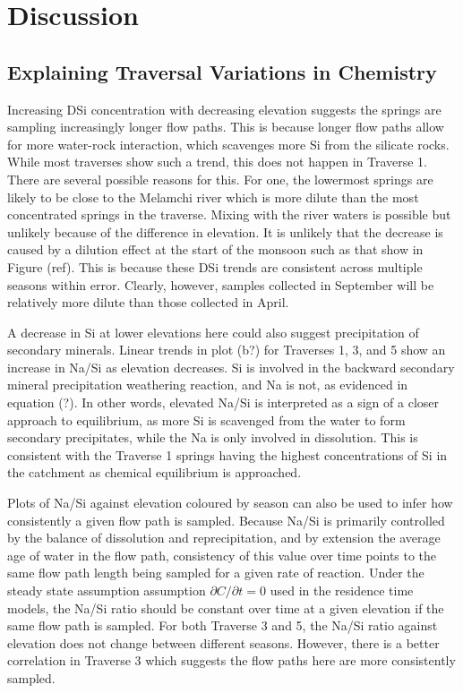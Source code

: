 

\section{Discussion}

\subsection{Explaining Traversal Variations in Chemistry}

Increasing DSi concentration with decreasing elevation suggests the springs are sampling increasingly longer flow paths. This is because longer flow paths allow for more water-rock interaction, which scavenges more Si from the silicate rocks. While most traverses show such a trend, this does not happen in Traverse 1. There are several possible reasons for this. For one, the lowermost springs are likely to be close to the Melamchi river which is more dilute than the most concentrated springs in the traverse. Mixing with the river waters is possible but unlikely because of the difference in elevation. It is unlikely that the decrease is caused by a dilution effect at the start of the monsoon such as that show in Figure (ref). This is because these DSi trends are consistent across multiple seasons within error. Clearly, however, samples collected in September will be relatively more dilute than those collected in April.

\bsk

A decrease in Si at lower elevations here could also suggest precipitation of secondary minerals. Linear trends in plot (b?) for Traverses 1, 3, and 5 show an increase in Na/Si as elevation decreases. Si is involved in the backward secondary mineral precipitation weathering reaction, and Na is not, as evidenced in equation (?). In other words, elevated Na/Si is interpreted as a sign of a closer approach to equilibrium, as more Si is scavenged from the water to form secondary precipitates, while the Na is only involved in dissolution. This is consistent with the Traverse 1 springs having the highest concentrations of Si in the catchment as chemical equilibrium is approached. 

\bsk

Plots of Na/Si against elevation coloured by season can also be used to infer how consistently a given flow path is sampled. Because Na/Si is primarily controlled by the balance of dissolution and reprecipitation, and by extension the average age of water in the flow path, consistency of this value over time points to the same flow path length being sampled for a given rate of reaction. Under the steady state assumption assumption $\partial C/\partial t = 0$ used in the residence time models, the Na/Si ratio should be constant over time at a given elevation if the same flow path is sampled. For both Traverse 3 and 5, the Na/Si ratio against elevation does not change between different seasons. However, there is a better correlation in Traverse 3 which suggests the flow paths here are more consistently sampled.



